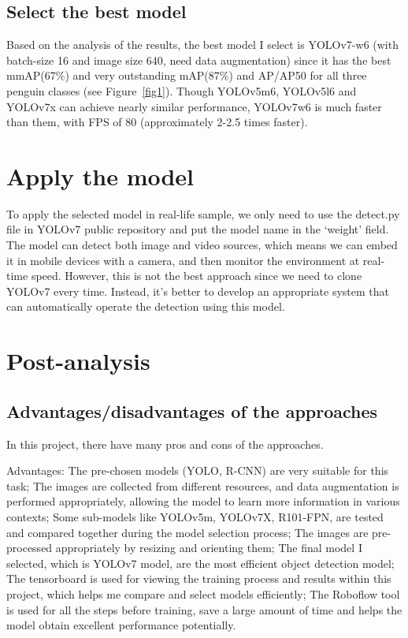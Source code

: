 \documentclass[runningheads]{llncs}
\begin{document}
\subsection{Select the best model}
Based on the analysis of the results, the best model I select is YOLOv7-w6 (with batch-size 16 and image size 640, need data augmentation) since it has the best mmAP(67\%) and very outstanding mAP(87\%) and AP/AP50 for all three penguin classes (see Figure~\ref{fig1}). Though YOLOv5m6, YOLOv5l6 and YOLOv7x can achieve nearly similar performance, YOLOv7w6 is much faster than them, with FPS of 80 (approximately 2-2.5 times faster).

\section{Apply the model}
To apply the selected model in real-life sample, we only need to use the detect.py file in YOLOv7 public repository and put the model name in the `weight' field. The model can detect both image and video sources, which means we can embed it in mobile devices with a camera, and then monitor the environment at real-time speed. However, this is not the best approach since we need to clone YOLOv7 every time. Instead, it's better to develop an appropriate system that can automatically operate the detection using this model.

\section{Post-analysis}
\subsection{Advantages/disadvantages of the approaches}
In this project, there have many pros and cons of the approaches.

Advantages: The pre-chosen models (YOLO, R-CNN) are very suitable for this task; The images are collected from different resources, and data augmentation is performed appropriately, allowing the model to learn more information in various contexts; Some sub-models like YOLOv5m, YOLOv7X, R101-FPN, are tested and compared together during the model selection process; The images are pre-processed appropriately by resizing and orienting them; The final model I selected, which is YOLOv7 model, are the most efficient object detection model; The tensorboard is used for viewing the training process and results within this project, which helps me compare and select models efficiently; The Roboflow tool is used for all the steps before training, save a large amount of time and helps the model obtain excellent performance potentially. 
\end{document}
